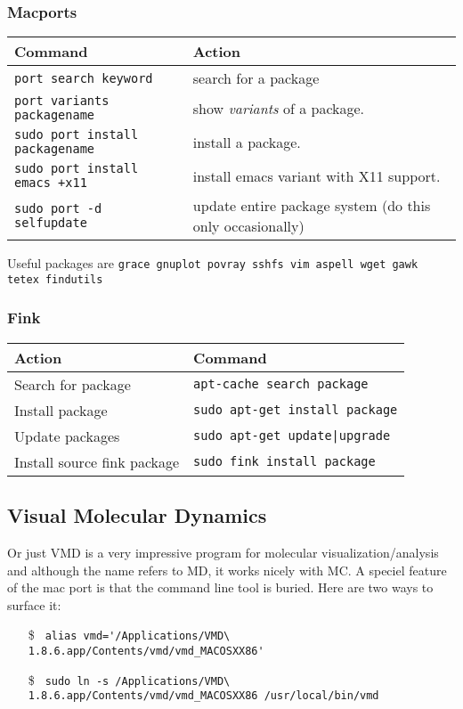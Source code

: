 \documentclass[a4paper,10pt]{article}
\begin{document}
\subsubsection{Macports}
\begin{table}[h!]
\center
\begin{tabular}{ll}\hline\hline
Command              & Action \\\hline
\verb"port search keyword" & search for a package\\
\verb+port variants packagename+ & show \emph{variants} of a package.\\
\verb"sudo port install packagename" & install a package.\\
\verb"sudo port install emacs +x11" & install emacs variant with X11 support.\\
\verb"sudo port -d selfupdate" & update entire package system (do this only occasionally)\\\hline
\end{tabular}\end{table}
%
Useful packages are \verb+grace gnuplot povray sshfs vim aspell wget gawk tetex findutils+

\subsubsection{Fink}
\begin{table}[h!]
\center
\begin{tabular}{ll}\hline\hline
Action              & Command \\\hline
Search for package  & \verb"apt-cache search package"\\
Install package     & \verb"sudo apt-get install package"\\
Update packages     &  \verb"sudo apt-get update|upgrade"\\
Install source fink package & \verb"sudo fink install package"\\\hline
\end{tabular}\end{table}

\subsection{Visual Molecular Dynamics}
Or just VMD is a very impressive program for molecular visualization/analysis and although the name refers to MD, it works nicely with MC. A speciel feature of the mac port is that the command line tool is buried. Here are two ways to surface it:
\begin{itemize}
\item[\$] \verb+ alias vmd='/Applications/VMD\ 1.8.6.app/Contents/vmd/vmd_MACOSXX86'+
\item[\$] \verb+ sudo ln -s /Applications/VMD\ 1.8.6.app/Contents/vmd/vmd_MACOSXX86 /usr/local/bin/vmd+\end{itemize}
\end{document}
